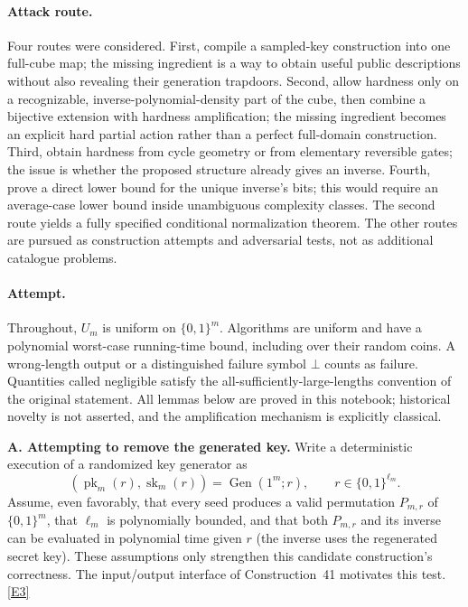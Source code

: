 \documentclass[11pt,a4paper]{article}
\newcommand{\eref}[2]{\hyperlink{extra:#1:#2}{[E#2]}}
\numberwithin{equation}{section}
\begin{document}
\paragraph{Attack route.}
Four routes were considered. First, compile a sampled-key construction
into one full-cube map; the missing ingredient is a way to obtain useful
public descriptions without also revealing their generation trapdoors.
Second, allow hardness only on a recognizable, inverse-polynomial-density
part of the cube, then combine a bijective extension with hardness
amplification; the missing ingredient becomes an explicit hard partial
action rather than a perfect full-domain construction. Third, obtain
hardness from cycle geometry or from elementary reversible gates; the
issue is whether the proposed structure already gives an inverse.
Fourth, prove a direct lower bound for the unique inverse's bits; this
would require an average-case lower bound inside unambiguous complexity
classes. The second route yields a fully specified conditional
normalization theorem. The other routes are pursued as construction
attempts and adversarial tests, not as additional catalogue problems.

\paragraph{Attempt.}
Throughout, $U_m$ is uniform on $\{0,1\}^m$. Algorithms are uniform and
have a polynomial worst-case running-time bound, including over their
random coins. A wrong-length output or a distinguished failure symbol
$\bot$ counts as failure. Quantities called negligible satisfy the
all-sufficiently-large-lengths convention of the original statement.
All lemmas below are proved in this notebook; historical novelty is not
asserted, and the amplification mechanism is explicitly classical.

\medskip{}
\textbf{A. Attempting to remove the generated key.}
Write a deterministic execution of a randomized key generator as
\[
 (\operatorname{pk}_m(r),\operatorname{sk}_m(r))
       =\operatorname{Gen}(1^m;r),\qquad r\in\{0,1\}^{\ell_m}.
\]
Assume, even favorably, that every seed produces a valid permutation
$P_{m,r}$ of $\{0,1\}^m$, that $\ell_m$ is polynomially bounded, and that
both $P_{m,r}$ and its inverse can be evaluated in polynomial time given
$r$ (the inverse uses the regenerated secret key). These assumptions
only strengthen this candidate construction's correctness.
The input/output interface of Construction~41 motivates this test.
\eref{30006696}{3}
\end{document}
